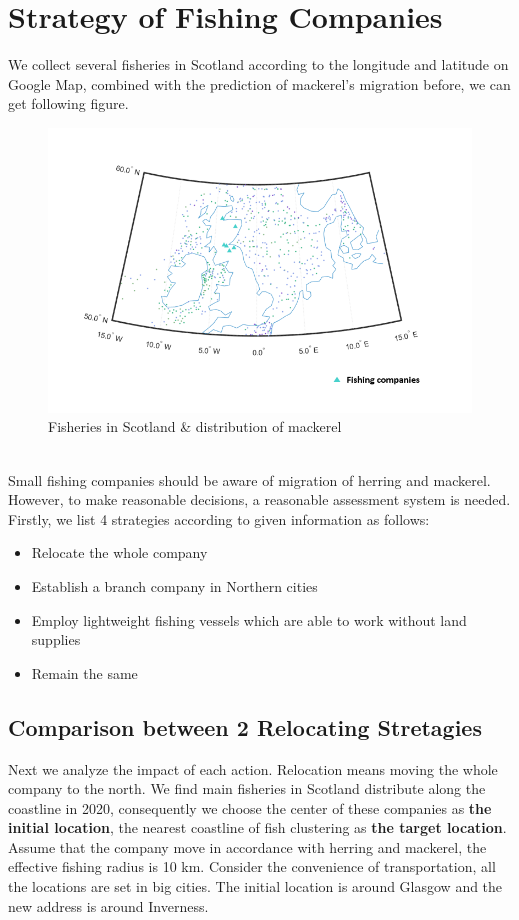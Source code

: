 \documentclass{mcmthesis}
\begin{document}
\section{Strategy of Fishing Companies}
We collect several fisheries in Scotland according to the longitude and latitude on Google Map, combined with the prediction of mackerel's migration before, we can get following figure.
\textbf{}
\begin{figure}[h]
\centering
\includegraphics[width=12.5cm]{./figures/fishery.png}
\caption{Fisheries in Scotland \& distribution of mackerel}
\end{figure}\\
Small fishing companies should be aware of migration of herring and mackerel. However, to make reasonable decisions, a reasonable assessment system is needed.
Firstly, we list 4 strategies according to given information as follows:
\begin{itemize}
\item Relocate the whole company
\item Establish a branch company in Northern cities
\item Employ lightweight fishing vessels which are able to work without land supplies
\item Remain the same
\end{itemize} 
\subsection{Comparison between 2 Relocating Stretagies}
Next we analyze the impact of each action.
Relocation means moving the whole company to the north. We find main fisheries in Scotland distribute along the coastline in 2020, consequently we choose the center of these companies as \textbf{the initial location}, the nearest coastline of fish clustering as \textbf{the target location}. Assume that the company move in accordance with herring and mackerel, the effective fishing radius is 10 km. 
Consider the convenience of transportation, all the locations are set in big cities.
The initial location is around Glasgow and the new address is around Inverness.\\
\end{document}
